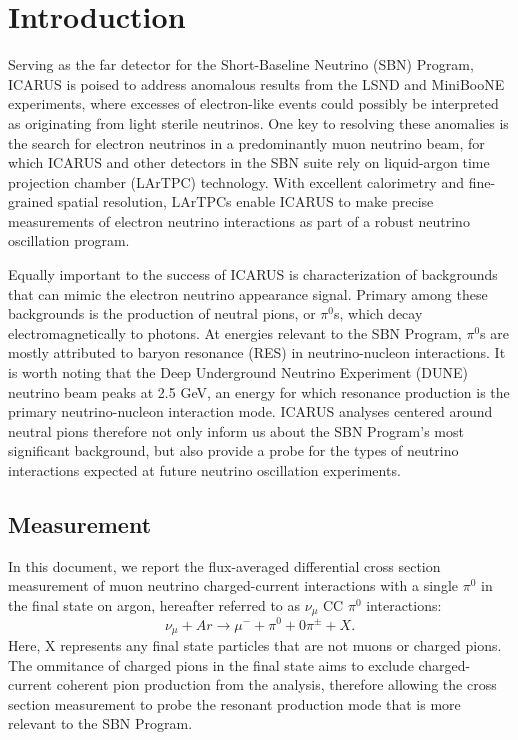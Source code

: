\documentclass[../main.tex]{subfiles}
\begin{document}
\section{Introduction}
\label{sec:intro}

Serving as the far detector for the Short-Baseline Neutrino (SBN) Program, ICARUS is poised to address anomalous results from the LSND and MiniBooNE experiments, where excesses of electron-like events could possibly be interpreted as originating from light sterile neutrinos. One key to resolving these anomalies is the search for electron neutrinos in a predominantly muon neutrino beam, for which ICARUS and other detectors in the SBN suite rely on liquid-argon time projection chamber (LArTPC) technology.  With excellent calorimetry and fine-grained spatial resolution, LArTPCs enable ICARUS to make precise measurements of electron neutrino interactions as part of a robust neutrino oscillation program.

Equally important to the success of ICARUS is characterization of backgrounds that can mimic the electron neutrino appearance signal.  Primary among these backgrounds is the production of neutral pions, or $\pi^{0}$s, which decay electromagnetically to photons.  At energies relevant to the SBN Program, $\pi^{0}$s are mostly attributed to baryon resonance (RES) in neutrino-nucleon interactions.  It is worth noting that the Deep Underground Neutrino Experiment (DUNE) neutrino beam peaks at 2.5 GeV, an energy for which resonance production is the primary neutrino-nucleon interaction mode.  ICARUS analyses centered around neutral pions therefore not only inform us about the SBN Program's most significant background, but also provide a probe for the types of neutrino interactions expected at future neutrino oscillation experiments.

\subsection{Measurement}
In this document, we report the flux-averaged differential cross section measurement of muon neutrino charged-current interactions with a single $\pi^{0}$ in the final state on argon, hereafter referred to as $\nu_{\mu}$ CC $\pi^{0}$ interactions:
\begin{equation}
    \nu_{\mu} + Ar \rightarrow \mu^{-} + \pi^{0} + 0\pi^{\pm} + X.
\end{equation}
Here, X represents any final state particles that are not muons or charged pions.  The ommitance of charged pions in the final state aims to exclude charged-current coherent pion production from the analysis, therefore allowing the cross section measurement to probe the resonant production mode that is more relevant to the SBN Program.
\end{document}
